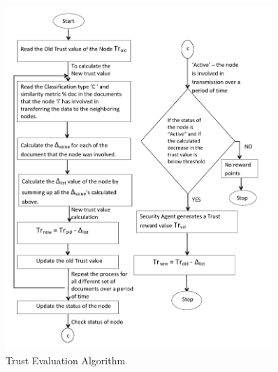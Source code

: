 \begin{figure}[h!]
    \label{fig:TrustAlgorithm}
    \begin{center}
        \includegraphics[width=0.90\textwidth]{Figures/Trust_Algorithm.png}
        \caption{Trust Evaluation Algorithm}
    \end{center}
\end{figure}
  

